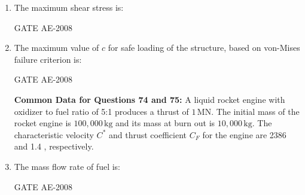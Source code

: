 \documentclass[journal,12pt,onecolumn]{IEEEtran}
\theoremstyle{remark}
\begin{document}
\begin{enumerate}
\quad 

\item The maximum shear stress is: \\ 
\begin{enumerate}
\end{enumerate}
\hfill{GATE AE-2008}

\quad 

\item The maximum value of $c $ for safe loading of the structure, based on von-Mises failure criterion is:  \\
\begin{enumerate}
\end{enumerate}
\hfill{GATE AE-2008}

\quad 

\textbf{Common Data for Questions 74 and 75:}  
A liquid rocket engine with oxidizer to fuel ratio of 5:1 produces a thrust of $ 1 \, \text{MN} $.  
The initial mass of the rocket engine is $ 100{,}000 \, \text{kg} $ and its mass at burn out is $10{,}000 \, \text{kg} $.  
The characteristic velocity $C^* $ and thrust coefficient $C_F $ for the engine are 2386   and 1.4 , respectively.\\

\item The mass flow rate of fuel is:  \\
\begin{enumerate}
\end{enumerate}
\hfill{GATE AE-2008}


\end{enumerate}
\end{document}
